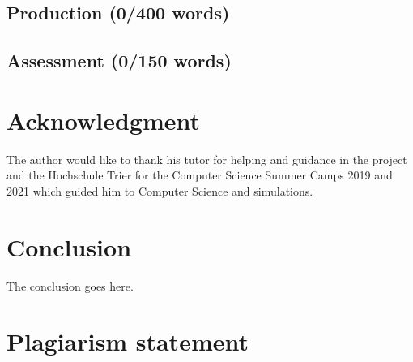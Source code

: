 \documentclass[conference,compsoc]{IEEEtran}
\begin{document}
\subsection{Production (0/400 words)}
\subsection{Assessment (0/150 words)}


\section*{Acknowledgment}
The author would like to thank his tutor for helping and guidance in the project and the Hochschule Trier for the Computer Science Summer Camps 2019 and 2021 which guided him to Computer Science and simulations.


\section{Conclusion}
The conclusion goes here.
\section{Plagiarism statement}
\end{document}
